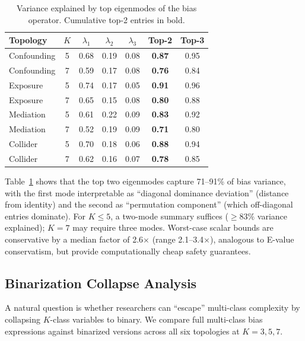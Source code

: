 \documentclass[11pt,letterpaper]{article}
\begin{document}
\begin{table}[t]
\centering
\small
\caption{Variance explained by top eigenmodes of the bias operator. Cumulative top-2 entries in bold.}
\label{tab:eigen}
\begin{tabular}{@{}lcccccc@{}}
\toprule
\textbf{Topology} & $K$ & $\lambda_1$ & $\lambda_2$ & $\lambda_3$ & \textbf{Top-2} & Top-3 \\
\midrule
Confounding & 5 & 0.68 & 0.19 & 0.08 & \textbf{0.87} & 0.95 \\
Confounding & 7 & 0.59 & 0.17 & 0.08 & \textbf{0.76} & 0.84 \\
Exposure & 5 & 0.74 & 0.17 & 0.05 & \textbf{0.91} & 0.96 \\
Exposure & 7 & 0.65 & 0.15 & 0.08 & \textbf{0.80} & 0.88 \\
Mediation & 5 & 0.61 & 0.22 & 0.09 & \textbf{0.83} & 0.92 \\
Mediation & 7 & 0.52 & 0.19 & 0.09 & \textbf{0.71} & 0.80 \\
Collider & 5 & 0.70 & 0.18 & 0.06 & \textbf{0.88} & 0.94 \\
Collider & 7 & 0.62 & 0.16 & 0.07 & \textbf{0.78} & 0.85 \\
\bottomrule
\end{tabular}
\end{table}

Table~\ref{tab:eigen} shows that the top two eigenmodes capture 71--91\% of bias variance, with the first mode interpretable as ``diagonal dominance deviation'' (distance from identity) and the second as ``permutation component'' (which off-diagonal entries dominate).
For $K \leq 5$, a two-mode summary suffices ($\geq 83\%$ variance explained); $K = 7$ may require three modes.
Worst-case scalar bounds are conservative by a median factor of 2.6$\times$ (range 2.1--3.4$\times$), analogous to E-value conservatism, but provide computationally cheap safety guarantees.

\subsection{Binarization Collapse Analysis}

A natural question is whether researchers can ``escape'' multi-class complexity by collapsing $K$-class variables to binary.
We compare full multi-class bias expressions against binarized versions across all six topologies at $K = 3, 5, 7$.
\end{document}
